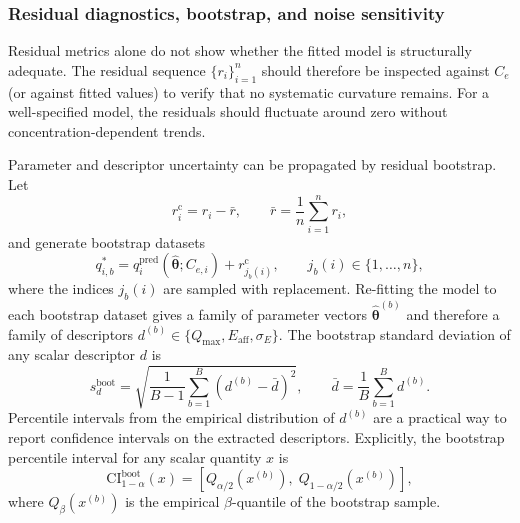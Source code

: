 \documentclass[journal=jacsat,manuscript=article]{achemso}
\begin{document}
\subsubsection{Residual diagnostics, bootstrap, and noise sensitivity}

Residual metrics alone do not show whether the fitted model is
structurally adequate. The residual sequence
$\{r_i\}_{i=1}^{n}$ should therefore be inspected against $C_e$ (or
against fitted values) to verify that no systematic curvature remains.
For a well-specified model, the residuals should fluctuate around zero
without concentration-dependent trends.

Parameter and descriptor uncertainty can be propagated by residual
bootstrap. Let
\begin{equation}
	r_i^{\mathrm{c}} = r_i - \bar{r},
	\qquad
	\bar{r} = \frac{1}{n}\sum_{i=1}^{n} r_i,
	\label{eq:si_centered_residuals}
\end{equation}
and generate bootstrap datasets
\begin{equation}
	q_{i,b}^{\ast}
	=
	q_i^{\mathrm{pred}}(\hat{\boldsymbol{\theta}}; C_{e,i})
	+
	r_{j_b(i)}^{\mathrm{c}},
	\qquad
	j_b(i) \in \{1,\dots,n\},
	\label{eq:si_bootstrap_dataset}
\end{equation}
where the indices $j_b(i)$ are sampled with replacement. Re-fitting the
model to each bootstrap dataset gives a family of parameter vectors
$\hat{\boldsymbol{\theta}}^{(b)}$ and therefore a family of descriptors
$d^{(b)} \in \{Q_{\max}, E_{\mathrm{aff}}, \sigma_E\}$. The bootstrap
standard deviation of any scalar descriptor $d$ is
\begin{equation}
	s_d^{\mathrm{boot}}
	=
	\sqrt{
	\frac{1}{B-1}
	\sum_{b=1}^{B}
	\left(d^{(b)} - \bar{d}\right)^2},
	\qquad
	\bar{d} = \frac{1}{B}\sum_{b=1}^{B} d^{(b)}.
	\label{eq:si_bootstrap_sd}
\end{equation}
Percentile intervals from the empirical distribution of $d^{(b)}$ are a
practical way to report confidence intervals on the extracted
descriptors.
Explicitly, the bootstrap percentile interval for any scalar quantity
$x$ is
\begin{equation}
	\mathrm{CI}^{\mathrm{boot}}_{1-\alpha}(x)
	=
	\left[
	Q_{\alpha/2}\!\left(x^{(b)}\right),\;
	Q_{1-\alpha/2}\!\left(x^{(b)}\right)
	\right],
	\label{eq:si_bootstrap_CI}
\end{equation}
where $Q_{\beta}(x^{(b)})$ is the empirical $\beta$-quantile of the
bootstrap sample.
\end{document}
